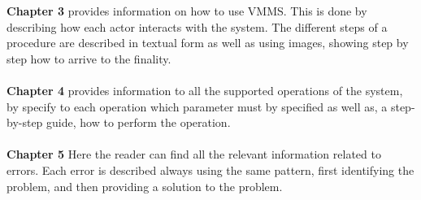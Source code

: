 \textbf{Chapter 3} provides information on how to use VMMS. This is done by
describing how each actor interacts with the system. The different steps of a procedure are
described in textual form as well as using images, showing step by step how to
arrive to the finality.\\\\

\textbf{Chapter 4} provides information to all the supported operations of the
system, by specify to each operation which parameter must by specified as well as, a
step-by-step  guide, how to perform the operation.\\\\

\textbf{Chapter 5} Here the reader can find all the relevant information related
to errors. Each error is described always using the same pattern, first identifying
the problem, and then providing a solution to the problem.



